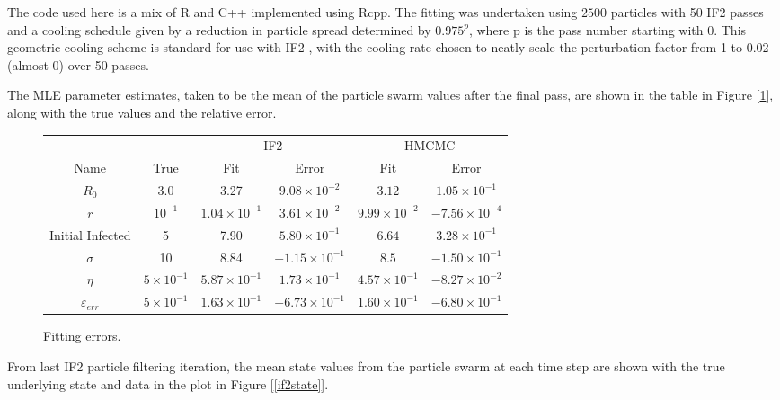 	The code used here is a mix of R and C++ implemented using Rcpp. The fitting was undertaken using $2500$ particles with 50 IF2 passes and a cooling schedule given by a reduction in particle spread determined by $0.975^{p}$, where p is the pass number starting with 0. This geometric cooling scheme is standard for use with IF2 \cite{King2015a}\cite{King2016}, with the cooling rate chosen to neatly scale the perturbation factor from 1 to 0.02 (almost 0) over 50 passes.

	The MLE parameter estimates, taken to be the mean of the particle swarm values after the final pass, are shown in the table in Figure [\ref{fiterror}], along with the true values and the relative error.

	\begin{figure}
		\centering
		{\small
		\begin{tabular}{cccccc}
			& & \multicolumn{2}{c}{IF2} & \multicolumn{2}{c}{HMCMC} \\
			\cmidrule[1.0pt](r){3-4} \cmidrule[1.0pt](r){5-6}
			Name & True	& Fit & Error & Fit & Error \\
			\cmidrule[1.0pt](r){1-1} \cmidrule[1.0pt](r){2-2} \cmidrule[1.0pt](r){3-3} \cmidrule[1.0pt](r){4-4} \cmidrule[1.0pt](r){5-5} \cmidrule[1.0pt](r){6-6}
			$R_0$ 				& 3.0 				 & 3.27 					& $9.08 \times 10^{-2}$ 	& $3.12$ 				& $1.05 \times 10^{-1}$		\\
			$r$ 				& $10^{-1}$  		 & $1.04 \times 10^{-1}$ 	& $3.61 \times 10^{-2}$ 	& $9.99 \times 10^{-2}$ & $-7.56 \times 10^{-4}$	\\
			Initial Infected 	& 5  				 & 7.90 					& $5.80 \times 10^{-1}$ 	& $6.64$ 				& $3.28 \times 10^{-1}$ 	\\
			$\sigma$ 			& 10   				 & 8.84 					& $-1.15 \times 10^{-1}$ 	& $8.5$ 				& $-1.50 \times 10^{-1}$	\\
			$\eta$ 				& $5 \times 10^{-1}$ & $5.87 \times 10^{-1}$ 	& $1.73 \times 10^{-1}$ 	& $4.57 \times 10^{-1}$ & $-8.27 \times 10^{-2}$ 	\\
			$\varepsilon_{err}$ & $5 \times 10^{-1}$ & $1.63 \times 10^{-1}$ 	& $-6.73 \times 10^{-1}$ 	& $1.60 \times10^{-1}$  & $-6.80 \times 10^{-1}$
		\end{tabular}}
	    \caption{Fitting errors. \label{fiterror}}
    \end{figure}


	From last IF2 particle filtering iteration, the mean state values from the particle swarm at each time step are shown with the true underlying state and data in the plot in Figure [\ref{if2state}].

